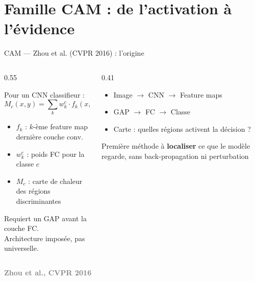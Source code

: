 \documentclass[10pt]{beamer}
\newcommand{\source}[1]{\vspace{6pt}\hfill{\textcolor{gray}{\textbf{\tiny #1}}}}
\begin{document}
\section{Famille CAM : de l'activation à l'évidence}

\begin{frame}{CAM --- Zhou et al. (CVPR 2016) : l'origine}
  \begin{columns}
    \begin{column}{0.55\textwidth}
      \begin{tcolorbox}[
        colback=blue!3, colframe=blue!40!black,
        arc=2mm, boxrule=0.5pt, fonttitle=\bfseries,
        title={Class Activation Maps}]
        Pour un CNN classifieur :
        \[
          M_c(x,y) = \sum_k w_k^c \cdot f_k(x,y)
        \]
        \vspace{-0.8cm}
        \begin{itemize}
          \item $f_k$ : $k$-ème feature map dernière couche conv.
          \item $w_k^c$ : poids FC pour la classe $c$
          \item $M_c$ : carte de chaleur des régions discriminantes
        \end{itemize}
      \end{tcolorbox}
      \begin{tcolorbox}[
        colback=red!3, colframe=red!60!black,
        arc=2mm, boxrule=0.5pt, fonttitle=\bfseries,
        title={Contrainte}]
        Requiert un GAP avant la couche FC.\\
        Architecture imposée, pas universelle.
      \end{tcolorbox}
    \end{column}
    \begin{column}{0.41\textwidth}
      \begin{tcolorbox}[
        colback=orange!3, colframe=orange!50!black,
        arc=2mm, boxrule=0.5pt, fonttitle=\bfseries,
        title={Principe visuel}]
        \begin{itemize}
          \item Image $\to$ CNN $\to$ Feature maps
          \item GAP $\to$ FC $\to$ Classe
          \item Carte : quelles régions activent la décision ?
        \end{itemize}
      \end{tcolorbox}
      \begin{tcolorbox}[
        colback=green!3, colframe=green!40!black,
        arc=2mm, boxrule=0.5pt, fonttitle=\bfseries,
        title={Intérêt}]
        Première méthode à \textbf{localiser} ce que le modèle regarde,
        sans back-propagation ni perturbation
      \end{tcolorbox}
    \end{column}
  \end{columns}
  \source{Zhou et al., CVPR 2016}
\end{frame}
\end{document}
